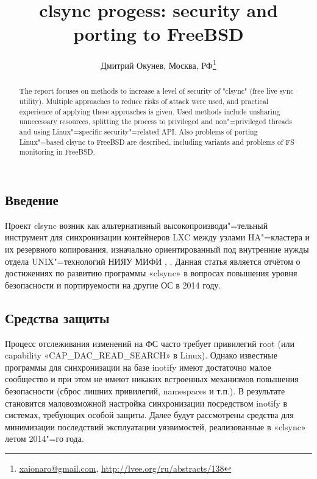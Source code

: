 \documentclass[10pt, a5paper]{article}
\begin{document}
\title{clsync progess: security and porting to FreeBSD}
\author{Дмитрий Окунев, Москва, РФ\footnote{\url{xaionaro@gmail.com}, \url{http://lvee.org/ru/abstracts/138}}}
\maketitle
\begin{abstract}
The report focuses on methods to increase a level of security of "clsync" (free live sync utility). Multiple approaches to reduce risks of attack were used, and practical experience of applying these approaches is given. Used methods include unsharing un\-necessary resources, splitting the process to privileged and non"=privileged threads and using Linux"=specific security"=related API. Also problems of porting Linux"=based clsync to FreeBSD are described, including variants and problems of FS monitoring in FreeBSD.
\end{abstract}
\subsection*{Введение}

Проект clsync возник как альтернативный высокопроизводи"=\linebreak тельный инструмент для синхронизации контейнеров LXC между узлами HA"=кластера и их резервного копирования, изначально ориентированный под внутренние нужды отдела UNIX"=технологий НИЯУ МИФИ \cite{Okunev1}, \cite{Okunev2}. Данная статья является отчётом о достижениях по развитию программы «clsync» в вопросах повышения уровня безопасности и портируемости на другие ОС в 2014 году.

\subsection*{Средства защиты}

Процесс отслеживания изменений на ФС часто требует  привилегий root (или capability «CAP\_DAC\_READ\_SEARCH» \cite{Okunev3} в Linux). Однако известные программы \cite{Okunev4} для синхронизации на базе inotify \cite{Okunev5} имеют достаточно малое сообщество и при этом не имеют никаких встроенных механизмов повышения безопасности (сброс лишних привилегий, namespaces и т.п.). В результате становится маловозможной настройка синхронизации посредством inotify в системах, требующих особой защиты. Далее будут рассмотрены средства для минимизации последствий эксплуатации уязвимостей, реализованные в «clsync» летом 2014"=го года.
\end{document}
